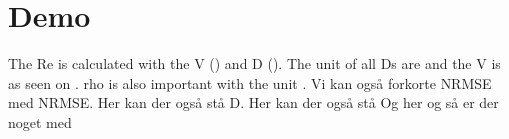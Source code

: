\section{Demo}
The \gls{Re} is calculated with the \gls{V} () and \gls{D} (). The unit of all \glspl{D} are  and the \gls{V} is  as seen on \cite[32]{Reynolds}. \Gls{rho} is also important with the unit . Vi kan også forkorte \acrlong{NRMSE} med \acrshort{NRMSE}.
\clearpage
Her kan der også stå \gls{D}.
\clearpage
Her kan der også stå 
\clearpage
Og her  og så er der noget med 
